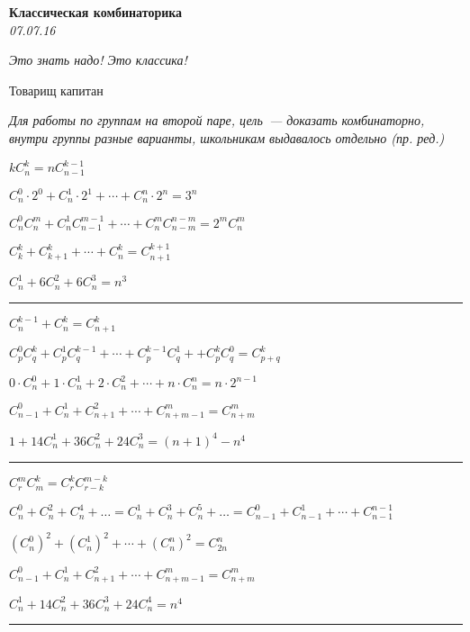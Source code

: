 \begin{center}
\textbf{\Large Классическая комбинаторика}\\
\textit{07.07.16}
\end{center}

\epigraph{\it Это знать надо! Это классика!}{Товарищ капитан}

\textit{Для работы по группам на второй паре, цель~--- доказать комбинаторно, внутри группы разные варианты, школьникам выдавалось отдельно (пр. ред.)}

\begin{problems}
\item $kC_n^k=nC_{n-1}^{k-1}$

\item $C_n^0\cdot 2^0+C_n^1\cdot 2^1+\cdots+C_n^n\cdot 2^n=3^n$

\item $C_n^0 C_n^m + C_n^1 C_{n-1}^{m-1} + \cdots + C_n^m C_{n-m}^{n-m}=2^m C_n^m$

\item $C_k^k+C_{k+1}^k+\cdots+C_n^k=C_{n+1}^{k+1}$

\item $C^1_n + 6C^2_n + 6C^3_n = n^3$
\end{problems}
\resetproblem
\vspace{5pt}
\hrule
\begin{problems}
\item $C_n^{k-1}+C_n^{k}=C_{n+1}^k$

\item $C_p^0 C_q^k + C_p^1 C_q^{k-1}+\cdots +C_p^{k-1} C_q^1 ++C_p^k C_q^0=C_{p+q}^k$

\item $0\cdot C_n^0 + 1\cdot C_n^1 + 2\cdot C_n^2+\cdots+n\cdot C_n^n=n\cdot 2^{n-1}$

\item $C_{n-1}^0+C_n^1+C_{n+1}^2+\cdots+C_{n+m-1}^m=C_{n+m}^m$

\item $1 + 14C^1_n + 36C^2_n + 24C^3_n = (n + 1)^4 - n^4$
\end{problems}
\resetproblem
\vspace{5pt}
\hrule
\begin{problems}
\item $C_r^m C_m^k=C_r^k C_{r-k}^{m-k}$

\item $C_n^0+C_n^2+C_n^4+\dots=C_n^1+C_n^3+C_n^5+\dots=C_{n-1}^0+C_{n-1}^1+\cdots+C_{n-1}^{n-1}$

\item $(C_n^0)^2 + (C_n^{1})^2+\cdots+(C_n^n)^2=C_{2n}^n$

\item $C_{n-1}^0+C_n^1+C_{n+1}^2+\cdots+C_{n+m-1}^m=C_{n+m}^m$

\item $C^1_n + 14C^2_n + 36C^3_n + 24C^4_n = n^4$
\end{problems}
\resetproblem
\vspace{5pt}
\hrule


